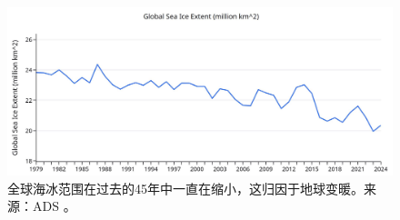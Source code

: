 \documentclass[10pt,twocolumn,letterpaper]{article}
\begin{document}
\begin{figure}[t]
\begin{center}
\includegraphics[width=1\textwidth]{ice.jpg}
\end{center}
   \caption{全球海冰范围在过去的45年中一直在缩小，这归因于地球变暖。来源：ADS \cite{149}。}
\label{fig:24}
\end{figure}

\clearpage
\twocolumn

{\small


}
\end{document}
